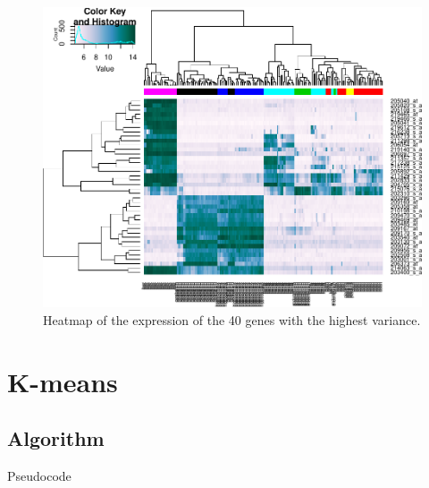 \documentclass[]{book}
\theoremstyle{definition}
\theoremstyle{definition}
\theoremstyle{definition}
\theoremstyle{remark}
\begin{document}
\begin{figure}

{\centering \includegraphics[width=1\linewidth]{09-clustering_files/figure-latex/heatmapTissueExpression-1} 

}

\caption{Heatmap of the expression of the 40 genes with the highest variance.}\label{fig:heatmapTissueExpression}
\end{figure}

\section{K-means}\label{k-means}

\subsection{Algorithm}\label{algorithm}

Pseudocode
\end{document}
